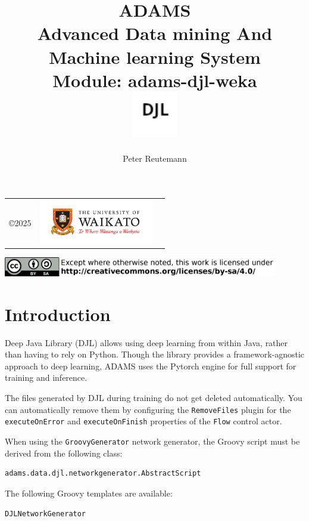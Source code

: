 \documentclass[a4paper]{book}
\title{
  \textbf{ADAMS} \\
  {\Large \textbf{A}dvanced \textbf{D}ata mining \textbf{A}nd \textbf{M}achine
  learning \textbf{S}ystem} \\
  {\Large Module: adams-djl-weka} \\
  \vspace{1cm}
  \includegraphics[width=2cm]{images/djl-module.png} \\
}
\author{
  Peter Reutemann
}
\begin{document}
\begin{titlepage}
\maketitle

\thispagestyle{empty}
\center
\begin{table}[b]
	\begin{tabular}{c l l}
		\parbox[c][2cm]{2cm}{\copyright 2025} &
		\parbox[c][2cm]{5cm}{\includegraphics[width=5cm]{images/coat_of_arms.pdf}} \\
	\end{tabular}
	\includegraphics[width=12cm]{images/cc.png} \\
\end{table}

\end{titlepage}

\tableofcontents

\chapter{Introduction}
Deep Java Library (DJL)\cite{djl} allows using deep learning from within Java, rather than having to rely on Python.
Though the library provides a framework-agnostic approach to deep learning, ADAMS uses the Pytorch engine for full
support for training and inference.

The files generated by DJL during training do not get deleted automatically. You can
automatically remove them by configuring the \texttt{RemoveFiles} plugin for the \texttt{executeOnError} and
\texttt{executeOnFinish} properties of the \texttt{Flow} control actor.

When using the \texttt{GroovyGenerator} network generator, the Groovy script must be derived
from the following class:
\begin{verbatim}
adams.data.djl.networkgenerator.AbstractScript
\end{verbatim}
The following Groovy templates are available:
\begin{tight_itemize}
    \item \texttt{DJLNetworkGenerator}
\end{tight_itemize}


\end{document}
